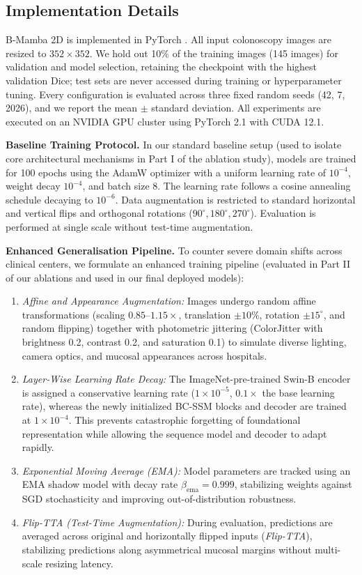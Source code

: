 \documentclass[journal]{IEEEtran}
\begin{document}
\subsection{Implementation Details}
B-Mamba 2D is implemented in PyTorch \cite{paszke2019pytorch}. All input colonoscopy images are resized to $352\times352$. We hold out 10\% of the training images (145 images) for validation and model selection, retaining the checkpoint with the highest validation Dice; test sets are never accessed during training or hyperparameter tuning. Every configuration is evaluated across three fixed random seeds (42, 7, 2026), and we report the mean $\pm$ standard deviation. All experiments are executed on an NVIDIA GPU cluster using PyTorch 2.1 with CUDA 12.1.

\textbf{Baseline Training Protocol.} In our standard baseline setup (used to isolate core architectural mechanisms in Part I of the ablation study), models are trained for 100 epochs using the AdamW optimizer \cite{loshchilov2019adamw} with a uniform learning rate of $10^{-4}$, weight decay $10^{-4}$, and batch size 8. The learning rate follows a cosine annealing schedule \cite{loshchilov2017sgdr} decaying to $10^{-6}$. Data augmentation is restricted to standard horizontal and vertical flips and orthogonal rotations ($90^\circ, 180^\circ, 270^\circ$). Evaluation is performed at single scale without test-time augmentation.

\textbf{Enhanced Generalisation Pipeline.} To counter severe domain shifts across clinical centers, we formulate an enhanced training pipeline (evaluated in Part II of our ablations and used in our final deployed models):
\begin{enumerate}
  \item \emph{Affine and Appearance Augmentation:} Images undergo random affine transformations (scaling $0.85\text{--}1.15\times$, translation $\pm10\%$, rotation $\pm15^\circ$, and random flipping) together with photometric jittering (ColorJitter with brightness 0.2, contrast 0.2, and saturation 0.1) to simulate diverse lighting, camera optics, and mucosal appearances across hospitals.
  \item \emph{Layer-Wise Learning Rate Decay:} The ImageNet-pre-trained Swin-B encoder is assigned a conservative learning rate ($1\times10^{-5}$, $0.1\times$ the base learning rate), whereas the newly initialized BC-SSM blocks and decoder are trained at $1\times10^{-4}$. This prevents catastrophic forgetting of foundational representation while allowing the sequence model and decoder to adapt rapidly.
  \item \emph{Exponential Moving Average (EMA):} Model parameters are tracked using an EMA shadow model with decay rate $\beta_{\text{ema}}=0.999$, stabilizing weights against SGD stochasticity and improving out-of-distribution robustness.
  \item \emph{Flip-TTA (Test-Time Augmentation):} During evaluation, predictions are averaged across original and horizontally flipped inputs (\emph{Flip-TTA}), stabilizing predictions along asymmetrical mucosal margins without multi-scale resizing latency.
\end{enumerate}
\end{document}
